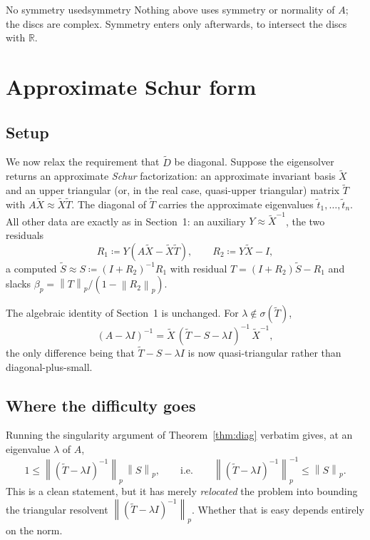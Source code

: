 \documentclass[11pt, a4paper]{article}
\numberwithin{equation}{section}
\newcommand{\norm}[1]{\left\|#1\right\|}
\newcommand{\tX}{\widetilde{X}}
\newcommand{\tD}{\widetilde{D}}
\newcommand{\tT}{\widetilde{T}}
\newcommand{\R}{\mathbb{R}}
\begin{document}
\begin{remark}{No symmetry used}{symmetry}
  Nothing above uses symmetry or normality of $A$; the discs are complex.
  Symmetry enters only afterwards, to intersect the discs with $\R$.
\end{remark}



\section{Approximate Schur form}

\subsection{Setup}

We now relax the requirement that $\tD$ be diagonal.  Suppose the eigensolver
returns an approximate \emph{Schur} factorization: an approximate invariant
basis $\tX$ and an upper triangular (or, in the real case, quasi-upper
triangular) matrix $\tT$ with $A\tX \approx \tX\tT$.  The diagonal of $\tT$
carries the approximate eigenvalues $\tilde t_1, \ldots, \tilde t_n$.  All other
data are exactly as in Section~1: an auxiliary $Y \approx \tX^{-1}$, the two
residuals
\[
  R_1 \coloneqq Y(A\tX - \tX\tT), \qquad R_2 \coloneqq Y\tX - I,
\]
a computed $\tilde S \approx S \coloneqq (I+R_2)^{-1}R_1$ with residual $T =
(I+R_2)\tilde S - R_1$ and slacks $\beta_p = \norm{T}_p/(1 - \norm{R_2}_p)$.

The algebraic identity of Section~1 is unchanged.  For $\lambda \notin
\sigma(\tT)$,
\begin{equation}\label{eq:schur-collapse}
  (A - \lambda I)^{-1} = \tX\,(\tT - S - \lambda I)^{-1}\,\tX^{-1},
\end{equation}
the only difference being that $\tT - S - \lambda I$ is now quasi-triangular
rather than diagonal-plus-small.

\subsection{Where the difficulty goes}

Running the singularity argument of Theorem~\ref{thm:diag} verbatim gives, at an
eigenvalue $\lambda$ of $A$,
\[
  1 \le \norm{(\tT - \lambda I)^{-1}}_p\,\norm{S}_p,
  \qquad\text{i.e.}\qquad
  \norm{(\tT - \lambda I)^{-1}}_p^{-1} \le \norm{S}_p.
\]
This is a clean statement, but it has merely \emph{relocated} the problem into
bounding the triangular resolvent $\norm{(\tT - \lambda I)^{-1}}_p$.  Whether
that is easy depends entirely on the norm.
\end{document}
